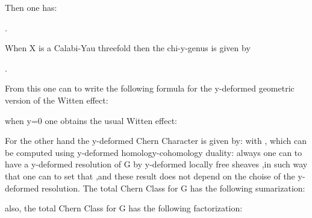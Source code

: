 \documentclass[a4paper,a4paper]{article}
\begin{document}
Then one has:

\begin{center}
{  \coordHE{} }
\end{center}.

When X is a Calabi-Yau threefold then the chi-y-genus is given by


\begin{center}
{  \coordHE{} }
\end{center}.

From this one can to write the following formula for the y-deformed geometric version of the Witten effect:

\begin{center}
{  \coordHE{} }
\end{center}
when y=0 one obtains the usual Witten effect:

\begin{center}
{  \coordHE{} }
\end{center}

For the other hand  the y-deformed Chern Character \coordHE{}  is given by:
\coordHE{} with \coordHE{}, which can be computed using y-deformed homology-cohomology duality: always one can to have a y-deformed resolution of G by y-deformed locally free sheaves  \coordHE{},in such way that one can to set that \coordHE{},and these result does not depend on the choise of the y-deformed resolution.
The total Chern Class for G  has the following sumarization:
\begin{center}
{  \coordHE{} }
\end{center} 
also, the total Chern Class for G has the following factorization:
\end{document}
